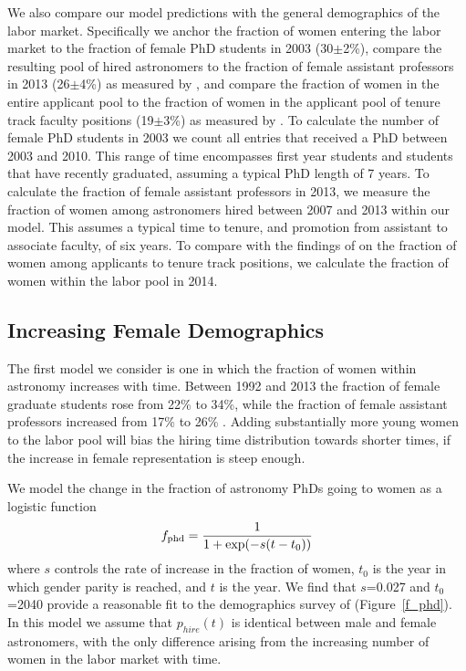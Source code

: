 \documentclass[modern]{aastex62}
\begin{document}
We also compare our model predictions with the general demographics of the labor market. Specifically we anchor the fraction of women entering the labor market to the fraction of female PhD students in 2003 (30$\pm$2\%), compare the resulting pool of hired astronomers to the fraction of female assistant professors in 2013 (26$\pm$4\%) as measured by \citet{hug14}, and compare the fraction of women in the entire applicant pool to the fraction of women in the applicant pool of tenure track faculty positions (19$\pm$3\%) as measured by \citet{tho15}. To calculate the number of female PhD students in 2003 we count all entries that received a PhD between 2003 and 2010. This range of time encompasses first year students and students that have recently graduated, assuming a typical PhD length of 7 years. To calculate the fraction of female assistant professors in 2013, we measure the fraction of women among astronomers hired between 2007 and 2013 within our model. This assumes a typical time to tenure, and promotion from assistant to associate faculty, of six years. To compare with the findings of \citet{tho15} on the fraction of women among applicants to tenure track positions, we calculate the fraction of women within the labor pool in 2014. 

\subsection{Increasing Female Demographics}
The first model we consider is one in which the fraction of women within astronomy increases with time. Between 1992 and 2013 the fraction of female graduate students rose from 22\% to 34\%, while the fraction of female assistant professors increased from 17\% to 26\% \citep{hug14}. Adding substantially more young women to the labor pool will bias the hiring time distribution towards shorter times, if the increase in female representation is steep enough.

We model the change in the fraction of astronomy PhDs going to women as a logistic function
\begin{equation}
f_{\rm phd} = \frac{1}{1+\exp (-s(t-t_0))}\\
\end{equation}
where $s$ controls the rate of increase in the fraction of women, $t_0$ is the year in which gender parity is reached, and $t$ is the year. We find that $s$=0.027 and $t_0$=2040 provide a reasonable fit to the demographics survey of \citet{hug14} (Figure~\ref{f_phd}). In this model we assume that $p_{hire}(t)$ is identical between male and female astronomers, with the only difference arising from the increasing number of women in the labor market with time. 
\end{document}
